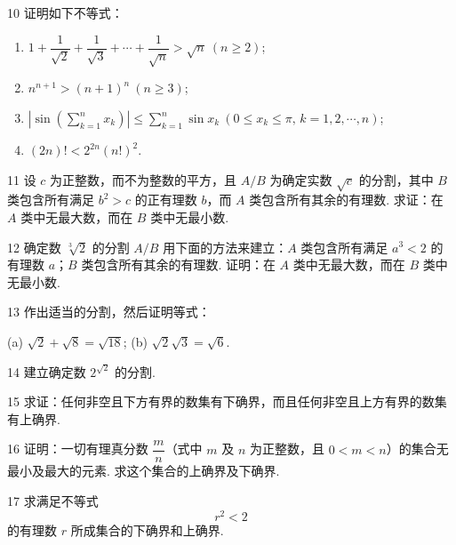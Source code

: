 \begin{prob}[L]{10}
证明如下不等式：
\begin{enumerate}[label=(\alph*), itemsep=2pt, topsep=3pt]
  \item $1 + \dfrac{1}{\sqrt{2}} + \dfrac{1}{\sqrt{3}} + \cdots + \dfrac{1}{\sqrt{n}} > \sqrt{n} \ (n \geqslant 2)$;
  \item $n^{n+1} > (n+1)^n \ (n \geqslant 3)$;
  \item $\left|\sin\left(\displaystyle\sum_{k=1}^{n} x_k\right)\right| \leqslant \displaystyle\sum_{k=1}^{n} \sin x_k \ (0 \leqslant x_k \leqslant \pi, \, k = 1, 2, \cdots, n)$;
  \item $(2n)! < 2^{2n}(n!)^2$.
\end{enumerate}
\end{prob}

\begin{prob}[M]{11}
设 $c$ 为正整数，而不为整数的平方，且 $A/B$ 为确定实数 $\sqrt{c}$ 的分割，其中 $B$ 类包含所有满足 $b^2 > c$ 的正有理数 $b$，而 $A$ 类包含所有其余的有理数. 求证：在 $A$ 类中无最大数，而在 $B$ 类中无最小数.
\end{prob}

\begin{prob}[M]{12}
确定数 $\sqrt[3]{2}$ 的分割 $A/B$ 用下面的方法来建立：$A$ 类包含所有满足 $a^3 < 2$ 的有理数 $a$；$B$ 类包含所有其余的有理数. 证明：在 $A$ 类中无最大数，而在 $B$ 类中无最小数.
\end{prob}

\begin{prob}[M]{13}
作出适当的分割，然后证明等式：

(a) $\sqrt{2} + \sqrt{8} = \sqrt{18}$; \qquad (b) $\sqrt{2}\sqrt{3} = \sqrt{6}$.
\end{prob}

\begin{prob}[M]{14}
建立确定数 $2^{\sqrt{2}}$ 的分割.
\end{prob}

\begin{prob}[M]{15}
求证：任何非空且下方有界的数集有下确界，而且任何非空且上方有界的数集有上确界.
\end{prob}

\begin{prob}[M]{16}
证明：一切有理真分数 $\dfrac{m}{n}$（式中 $m$ 及 $n$ 为正整数，且 $0 < m < n$）的集合无最小及最大的元素. 求这个集合的上确界及下确界.
\end{prob}

\begin{prob}[M]{17}
求满足不等式
\[
r^2 < 2
\]
的有理数 $r$ 所成集合的下确界和上确界.
\end{prob}

